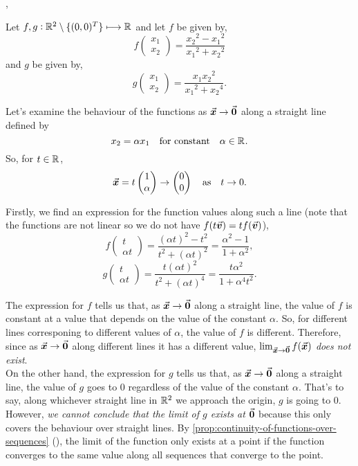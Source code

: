 \documentclass[../MathsNotesBase.tex]{subfiles}
\begin{document}
	\nl[12]
	\sep
	\begin{exe}
		\ex Let ${ f,g: \mathbb{R}^{2} \setminus \{ (0,0)^T \} \longmapsto \mathbb{R}^{} }$ and let $f$ be given by,
		\[ f\begin{pmatrix}x_1\\x_2\end{pmatrix} = \frac{{x_2}^2 - {x_1}^2}{{x_1}^2 + {x_2}^2} \]
		and $g$ be given by,
		\[ g\begin{pmatrix}x_1\\x_2\end{pmatrix} = \frac{x_1{x_2}^2}{{x_1}^2 + {x_2}^4}. \]
		
		Let's examine the behaviour of the functions as ${ \vec{\bm{x}} \to \vec{\bm{0}} }$ along a straight line defined by
		\[ x_2 = \alpha x_1 \hspace{10pt}\text{for constant}\hspace{10pt} \alpha \in \mathbb{R}^{}. \]
		So, for ${ t \in \mathbb{R}^{} }$,
		\[ \vec{\bm{x}} = t \begin{pmatrix}1\\ \alpha\end{pmatrix} \to \begin{pmatrix}0\\0\end{pmatrix} \hspace{10pt}\text{as}\hspace{10pt} t \to 0. \]
		
		Firstly, we find an expression for the function values along such a line (note that the functions are not linear so we do not have ${ f(t\vec{\bm{v}}) = tf(\vec{\bm{v}}) }$),
		\[ f\begin{pmatrix}t\\ \alpha t\end{pmatrix} = \frac{(\alpha t)^2 - t^2}{t^2 + (\alpha t)^2} = \frac{\alpha^2 - 1}{1 + \alpha^2}, \]
		\[ g\begin{pmatrix}t\\ \alpha t\end{pmatrix} = \frac{t(\alpha t)^2}{t^2 + (\alpha t)^4} = \frac{t\alpha^2}{1 + \alpha^4 t^2}. \]
		
		\nl[2]
		The expression for $f$ tells us that, as ${ \vec{\bm{x}} \to \vec{\bm{0}} }$ along a straight line, the value of $f$ is constant at a value that depends on the value of the constant $\alpha$. So, for different lines corresponing to different values of $\alpha$, the value of $f$ is different. Therefore, since as ${ \vec{\bm{x}} \to \vec{\bm{0}} }$ along different lines it has a different value, ${ \lim_{\vec{\bm{x}} \to \vec{\bm{0}}} f(\vec{\bm{x}}) }$ \textit{does not exist}.\\
		
		On the other hand, the expression for $g$ tells us that, as ${ \vec{\bm{x}} \to \vec{\bm{0}} }$ along a straight line, the value of $g$ goes to 0 regardless of the value of the constant $\alpha$. That's to say, along whichever straight line in $\mathbb{R}^{2}$ we approach the origin, $g$ is going to 0. However, \textit{we cannot conclude that the limit of $g$ exists at $\vec{\bm{0}}$} because this only covers the behaviour over straight lines. By \autoref{prop:continuity-of-functions-over-sequences} (), the limit of the function only exists at a point if the function converges to the same value along all sequences that converge to the point.\\
		

\end{exe}
\end{document}
